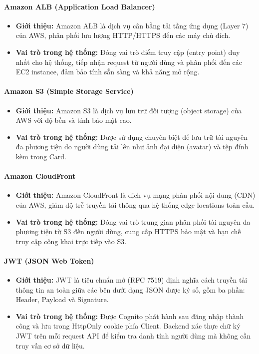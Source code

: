 \paragraph{Amazon ALB (Application Load Balancer)}
\begin{itemize}
    \item \textbf{Giới thiệu:} Amazon ALB là dịch vụ cân bằng tải tầng ứng dụng (Layer 7) của AWS, phân phối lưu lượng HTTP/HTTPS đến các máy chủ đích.
    \item \textbf{Vai trò trong hệ thống:} Đóng vai trò điểm truy cập (entry point) duy nhất cho hệ thống, tiếp nhận request từ người dùng và phân phối đến các EC2 instance, đảm bảo tính sẵn sàng và khả năng mở rộng.
\end{itemize}

\paragraph{Amazon S3 (Simple Storage Service)}
\begin{itemize}
    \item \textbf{Giới thiệu:} Amazon S3 là dịch vụ lưu trữ đối tượng (object storage) của AWS với độ bền và tính bảo mật cao.
    \item \textbf{Vai trò trong hệ thống:} Được sử dụng chuyên biệt để lưu trữ tài nguyên đa phương tiện do người dùng tải lên như ảnh đại diện (avatar) và tệp đính kèm trong Card.
\end{itemize}

\paragraph{Amazon CloudFront}
\begin{itemize}
    \item \textbf{Giới thiệu:} Amazon CloudFront là dịch vụ mạng phân phối nội dung (CDN) của AWS, giảm độ trễ truyền tải thông qua hệ thống edge locations toàn cầu.
    \item \textbf{Vai trò trong hệ thống:} Đóng vai trò trung gian phân phối tài nguyên đa phương tiện từ S3 đến người dùng, cung cấp HTTPS bảo mật và hạn chế truy cập công khai trực tiếp vào S3.
\end{itemize}

\paragraph{JWT (JSON Web Token)}
\begin{itemize}
    \item \textbf{Giới thiệu:} JWT là tiêu chuẩn mở (RFC 7519) định nghĩa cách truyền tải thông tin an toàn giữa các bên dưới dạng JSON được ký số, gồm ba phần: Header, Payload và Signature.
    \item \textbf{Vai trò trong hệ thống:} Được Cognito phát hành sau đăng nhập thành công và lưu trong HttpOnly cookie phía Client. Backend xác thực chữ ký JWT trên mỗi request API để kiểm tra danh tính người dùng mà không cần truy vấn cơ sở dữ liệu.
\end{itemize}

